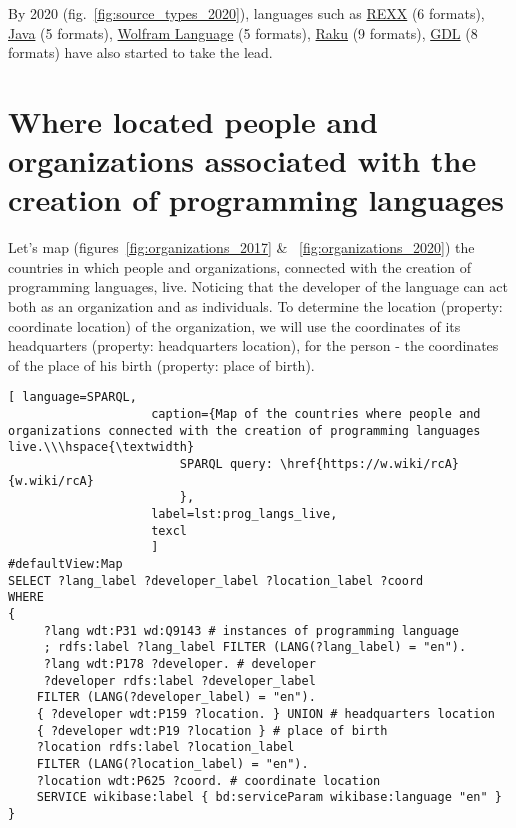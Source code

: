 By 2020 (fig.~\ref{fig:source_types_2020}), languages such as  \href{https://en.wikipedia.org/wiki/REXX}{REXX} (6 formats), \href{https://en.wikipedia.org/wiki/Java_(programming_language)}{Java} (5 formats), \href{https://en.wikipedia.org/wiki/Wolfram_Language}{Wolfram Language} (5 formats), \href{https://en.wikipedia.org/wiki/Raku_(programming_language)}{Raku} (9 formats), \href{https://en.wikipedia.org/wiki/Geometric_Description_Language}{GDL} (8 formats) have also started to take the lead.

\section{Where located people and organizations associated with the creation of programming languages}

Let's map (figures~\ref{fig:organizations_2017} \& ~\ref{fig:organizations_2020}) the countries in which people and organizations, connected with the creation of programming languages, live. Noticing that the developer of the language can act both as an organization and as individuals. To determine the location (property: coordinate location) of the organization, we will use the coordinates of its headquarters (property: headquarters location), for the person - the coordinates of the place of his birth (property: place of birth).

\begin{lstlisting}[ language=SPARQL, 
                    caption={Map of the countries where people and organizations connected with the creation of programming languages live.\\\hspace{\textwidth}
                        SPARQL query: \href{https://w.wiki/rcA}{w.wiki/rcA}
                        },
                    label=lst:prog_langs_live,
                    texcl 
                    ]
#defaultView:Map
SELECT ?lang_label ?developer_label ?location_label ?coord
WHERE
{
	 ?lang wdt:P31 wd:Q9143 # instances of programming language
	 ; rdfs:label ?lang_label FILTER (LANG(?lang_label) = "en"). 
	 ?lang wdt:P178 ?developer. # developer
	 ?developer rdfs:label ?developer_label
	FILTER (LANG(?developer_label) = "en"). 
	{ ?developer wdt:P159 ?location. } UNION # headquarters location
	{ ?developer wdt:P19 ?location } # place of birth
	?location rdfs:label ?location_label 
	FILTER (LANG(?location_label) = "en").
 	?location wdt:P625 ?coord. # coordinate location
 	SERVICE wikibase:label { bd:serviceParam wikibase:language "en" } 	
}
\end{lstlisting}%

